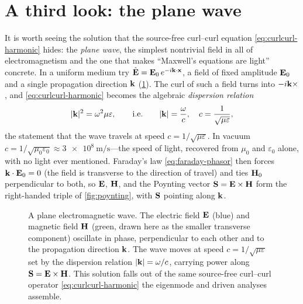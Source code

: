 \section{A third look: the plane wave}
\label{sec:planewave}

It is worth seeing the solution that the source-free curl--curl equation
\eqref{eq:curlcurl-harmonic} hides: the \emph{plane wave}, the simplest
nontrivial field in all of electromagnetism and the one that makes ``Maxwell's
equations are light'' concrete. In a uniform medium try
$\hat{\mathbf{E}}=\mathbf{E}_0\,e^{-i\mathbf{k}\cdot\mathbf{x}}$, a field of fixed amplitude $\mathbf{E}_0$ and a
single propagation direction $\mathbf{k}$ (\cref{fig:planewave}). The curl of such a
field turns into $-i\mathbf{k}\times$, and \eqref{eq:curlcurl-harmonic} becomes the
algebraic \emph{dispersion relation}
\[
  \lvert\mathbf{k}\rvert^2 = \omega^2\mu\varepsilon,
  \qquad\text{i.e.}\qquad
  \lvert\mathbf{k}\rvert = \frac{\omega}{c}, \quad c=\frac{1}{\sqrt{\mu\varepsilon}},
\]
the statement that the wave travels at speed $c=1/\sqrt{\mu\varepsilon}$. In
vacuum $c=1/\sqrt{\mu_0\varepsilon_0}\approx\SI{3e8}{\meter\per\second}$---the
speed of light, recovered from $\mu_0$ and $\varepsilon_0$ alone, with no light
ever mentioned. Faraday's law \eqref{eq:faraday-phasor} then forces
$\mathbf{k}\cdot\mathbf{E}_0=0$ (the field is transverse to the direction of travel) and ties
$\mathbf{H}_0$ perpendicular to both, so $\mathbf{E}$, $\mathbf{H}$, and the Poynting vector
$\mathbf{S}=\mathbf{E}\times\mathbf{H}$ form the right-handed triple of \cref{fig:poynting}, with
$\mathbf{S}$ pointing along $\mathbf{k}$.

\begin{figure}[t]
\centering
{}
\caption[A plane wave]{A plane electromagnetic wave. The electric field $\mathbf{E}$
(blue) and magnetic field $\mathbf{H}$ (green, drawn here as the smaller transverse
component) oscillate in phase, perpendicular to each other and to the
propagation direction $\mathbf{k}$. The wave moves at speed $c=1/\sqrt{\mu\varepsilon}$
set by the dispersion relation $\lvert\mathbf{k}\rvert=\omega/c$, carrying power along
$\mathbf{S}=\mathbf{E}\times\mathbf{H}$. This solution falls out of the same source-free curl--curl
operator \eqref{eq:curlcurl-harmonic} the eigenmode and driven analyses
assemble.}
\label{fig:planewave}
\end{figure}

